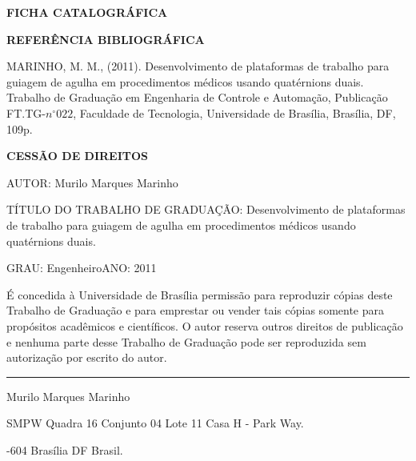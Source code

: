 \noindent \textbf{FICHA CATALOGRÁFICA}

\noindent %

\noindent \medskip{}


\noindent \textbf{REFERÊNCIA BIBLIOGRÁFICA}

MARINHO, M. M., (2011). Desenvolvimento de plataformas de trabalho
para guiagem de agulha em procedimentos médicos usando quatérnions
duais. Trabalho de Graduação em Engenharia de Controle e Automação,
Publicação FT.TG-$n^{\circ}022$, Faculdade de Tecnologia, Universidade
de Brasília, Brasília, DF, 109p.

\noindent \bigskip{}


\noindent \textbf{CESSÃO DE DIREITOS}

\noindent AUTOR: Murilo Marques Marinho

TÍTULO DO TRABALHO DE GRADUAÇÃO: Desenvolvimento de plataformas de
trabalho para guiagem de agulha em procedimentos médicos usando quatérnions
duais.

\noindent \medskip{}


\noindent GRAU: Engenheiro\hfill{}ANO: 2011\hfill{}

\noindent \medskip{}


É concedida à Universidade de Brasília permissão para reproduzir cópias
deste Trabalho de Graduação e para emprestar ou vender tais cópias
somente para propósitos acadêmicos e científicos. O autor reserva
outros direitos de publicação e nenhuma parte desse Trabalho de Graduação
pode ser reproduzida sem autorização por escrito do autor.

\noindent \bigskip{}


\noindent \rule[0.5ex]{1\columnwidth}{1pt}

\noindent Murilo Marques Marinho

\noindent SMPW Quadra 16 Conjunto 04 Lote 11 Casa H - Park Way.

-604 Brasília \textendash{} DF \textendash{} Brasil.
